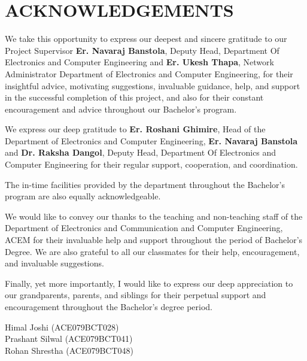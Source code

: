 \documentclass[main]{subfiles}
\begin{document}
\section*{\centering \Large{\textbf{\MakeUppercase{Acknowledgements}} }}

\noindent We take this opportunity to express our deepest and sincere gratitude to our Project Supervisor \textbf{Er. Navaraj Banstola}, Deputy Head, Department Of Electronics and Computer Engineering and \textbf{Er. Ukesh Thapa}, Network Administrator Department of Electronics and Computer Engineering, for their insightful advice, motivating suggestions, invaluable guidance, help, and support in the successful completion of this project, and also for their constant encouragement and advice throughout our Bachelor's program.\par
\noindent We express our deep gratitude to \textbf{Er. Roshani Ghimire}, Head of the Department of Electronics and Computer Engineering, \textbf{Er. Navaraj Banstola} and \textbf{Dr. Raksha Dangol}, Deputy Head, Department Of Electronics and Computer Engineering for their regular support, cooperation, and coordination.\par
\noindent The in-time facilities provided by the department throughout the Bachelor's program are also equally acknowledgeable.\par
\noindent We would like to convey our thanks to the teaching and non-teaching staff of the Department of Electronics and Communication and Computer Engineering, ACEM for their invaluable help and support throughout the period of Bachelor’s Degree. We are also grateful to all our classmates for their help, encouragement, and invaluable suggestions.\par
\noindent Finally, yet more importantly, I would like to express our deep appreciation to our grandparents, parents, and siblings for their perpetual support and encouragement throughout the Bachelor’s degree period.\par
\vspace{1cm}

\noindent Himal Joshi (ACE079BCT028)\\
\noindent Prashant Silwal (ACE079BCT041)\\
\noindent Rohan Shrestha (ACE079BCT048)

           
\end{document}

